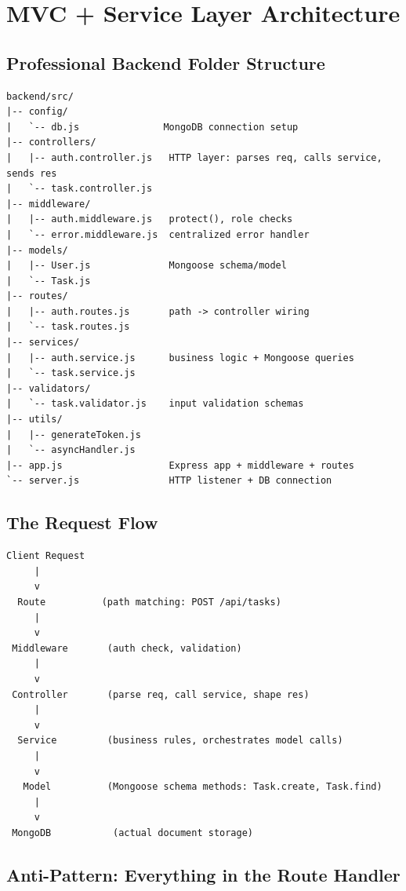 \chapter{MVC + Service Layer Architecture}

\section{Professional Backend Folder Structure}

\begin{diagrambox}
\begin{verbatim}
backend/src/
|-- config/
|   `-- db.js               MongoDB connection setup
|-- controllers/
|   |-- auth.controller.js   HTTP layer: parses req, calls service, sends res
|   `-- task.controller.js
|-- middleware/
|   |-- auth.middleware.js   protect(), role checks
|   `-- error.middleware.js  centralized error handler
|-- models/
|   |-- User.js              Mongoose schema/model
|   `-- Task.js
|-- routes/
|   |-- auth.routes.js       path -> controller wiring
|   `-- task.routes.js
|-- services/
|   |-- auth.service.js      business logic + Mongoose queries
|   `-- task.service.js
|-- validators/
|   `-- task.validator.js    input validation schemas
|-- utils/
|   |-- generateToken.js
|   `-- asyncHandler.js
|-- app.js                   Express app + middleware + routes
`-- server.js                HTTP listener + DB connection
\end{verbatim}
\end{diagrambox}

\section{The Request Flow}

\begin{diagrambox}
\begin{verbatim}
Client Request
     |
     v
  Route          (path matching: POST /api/tasks)
     |
     v
 Middleware       (auth check, validation)
     |
     v
 Controller       (parse req, call service, shape res)
     |
     v
  Service         (business rules, orchestrates model calls)
     |
     v
   Model          (Mongoose schema methods: Task.create, Task.find)
     |
     v
 MongoDB           (actual document storage)
\end{verbatim}
\end{diagrambox}

\section{Anti-Pattern: Everything in the Route Handler}

